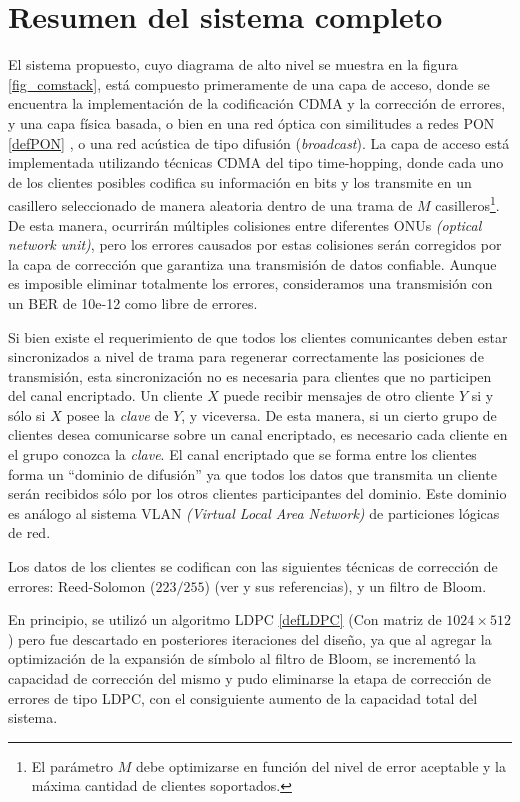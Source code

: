 \section{Resumen del sistema completo}
El sistema propuesto, cuyo diagrama de alto nivel se muestra en la figura \ref{fig_comstack}, está compuesto primeramente de una capa de acceso, donde se encuentra la implementación de la codificación CDMA y la corrección de errores, y una capa física basada, o bien en una red óptica con similitudes a redes PON \ref{defPON} , o una red acústica de tipo difusión (\textit{broadcast}).
La capa de acceso está implementada utilizando técnicas CDMA del tipo time-hopping, donde cada uno de los clientes posibles codifica su información en bits y los transmite en un casillero seleccionado de manera aleatoria dentro de una trama de $M$ casilleros\footnote{ El parámetro $M$ debe optimizarse en función del nivel de error aceptable y la máxima cantidad de clientes soportados.}. De esta manera, ocurrirán múltiples colisiones entre diferentes ONUs \textit{(optical network unit)}, pero los errores causados por estas colisiones serán corregidos por la capa de corrección que garantiza una transmisión de datos confiable. Aunque es imposible eliminar totalmente los errores, consideramos una transmisión con un BER de 10e-12 como libre de errores.

Si bien existe el requerimiento de que todos los clientes comunicantes deben estar sincronizados a nivel de trama para regenerar correctamente las posiciones de transmisión, esta sincronización no es necesaria para clientes que no participen del canal encriptado.
Un cliente $X$ puede recibir mensajes de otro cliente $Y$ si y sólo si $X$ posee la {\em clave} de $Y$, y viceversa. De esta manera, si un cierto grupo de clientes desea comunicarse sobre un canal encriptado, es necesario cada cliente en el grupo conozca la {\em clave}. El canal encriptado que se forma entre los clientes forma un ``dominio de difusión'' ya que todos los datos que transmita un cliente serán recibidos sólo por los otros clientes participantes del dominio. Este dominio es análogo al sistema VLAN \textit{(Virtual Local Area Network)} de particiones lógicas de red.

Los datos de los clientes se codifican con las siguientes técnicas de corrección de errores: Reed-Solomon ($223/255$) (ver \cite{Moon:05} y sus referencias), y un filtro de Bloom\cite{Bloom70space/timetrade-offs}. 

En principio, se utilizó un algoritmo LDPC \ref{defLDPC} (Con matriz de $1024\times512$) pero fue descartado en posteriores iteraciones del diseño, ya que al agregar la optimización de la expansión de símbolo al filtro de Bloom, se incrementó la capacidad de corrección del mismo y pudo eliminarse la etapa de corrección de errores de tipo LDPC, con el consiguiente aumento de la capacidad total del sistema.

